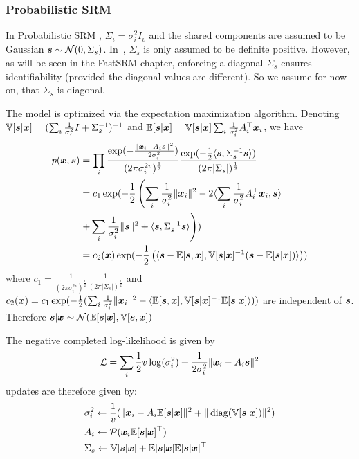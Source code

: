 \subsubsection{Probabilistic SRM}
\label{sec:probabilisticsrm}
In Probabilistic SRM , $\Sigma_i=\sigma_i^2 I_v$ and the shared
components are assumed to be Gaussian $\boldsymbol{s} \sim \mathcal{N}(0, \Sigma_s)$.
In~\cite{chen2015reduced}, $\Sigma_s$ is only assumed to be definite positive. However,
as will be seen in the FastSRM chapter, enforcing a diagonal $\Sigma_s$ ensures
identifiability (provided the diagonal values are different). So we assume for
now on, that $\Sigma_s$ is diagonal.

The model is optimized via the expectation maximization algorithm.
Denoting $\mathbb{V}[\boldsymbol{s} | \boldsymbol{x}] = (\sum_i \frac1{\sigma_i^2} I +
\Sigma_s^{-1})^{-1}$ and $\mathbb{E}[\boldsymbol{s} | \boldsymbol{x}] = \mathbb{V}[\boldsymbol{s} | \boldsymbol{x}] \sum_i \frac1{\sigma_i^2}
A_i^{\top}\boldsymbol{x}_i$, we have
\begin{align}
  p(\boldsymbol{x}, \boldsymbol{s}) &= \prod_i \frac{\exp(-\frac{\|\boldsymbol{x}_i - A_i \boldsymbol{s} \|^2}{2 \sigma_i^2})}{(2 \pi \sigma_i^{2v})^{\frac12}} \frac{\exp(-\frac12 \langle{ \boldsymbol{s}},{ \Sigma_s^{-1} \boldsymbol{s} }\rangle )}{(2 \pi | \Sigma_s|)^{\frac12}} \\
               &= c_1 \exp(-\frac12 \left( \sum_i \frac1{\sigma_i^2}\|\boldsymbol{x}_i\|^2 - 2  \langle{ \sum_i \frac1{\sigma_i^2} A_i^{\top}\boldsymbol{x}_i},{ \boldsymbol{s} }\rangle \right. \\& \left.+ \sum_i \frac1{\sigma_i^2} \| \boldsymbol{s} \|^2 + \langle{ \boldsymbol{s}},{ \Sigma_s^{-1} \boldsymbol{s} }\rangle  \right)) \\
               &= c_2(\boldsymbol{x}) \exp(-\frac12 \left( \langle{  \boldsymbol{s}- \mathbb{E}[\boldsymbol{s}},{ \boldsymbol{x}], \mathbb{V}[\boldsymbol{s} | \boldsymbol{x}]^{-1} ( \boldsymbol{s} - \mathbb{E}[\boldsymbol{s} | \boldsymbol{x}])  }\rangle \right)) \label{probsrmcompleted}
\end{align}
where $c_1 = \frac1{(2 \pi \sigma_i^{2v})^{\frac12}}\frac1{(2 \pi |
  \Sigma_s|)^{\frac12}}$ and $c_2(\boldsymbol{x}) = c_1 \exp(-\frac12( \sum_i
\frac1{\sigma_i^2}\|\boldsymbol{x}_i\|^2 - \langle{  \mathbb{E}[\boldsymbol{s}},{ \boldsymbol{x}], \mathbb{V}[\boldsymbol{s} | \boldsymbol{x}]^{-1} \mathbb{E}[\boldsymbol{s} | \boldsymbol{x}] }\rangle))$ are independent of $\boldsymbol{s}$.
Therefore $\boldsymbol{s}| \boldsymbol{x} \sim \mathcal{N}(\mathbb{E}[\boldsymbol{s} | \boldsymbol{x}], \mathbb{V}[\boldsymbol{s}, \boldsymbol{x}])$

The negative completed log-likelihood is given by
\begin{align}
	\mathcal{L} = \sum_i \frac12 v \log(\sigma_i^2) + \frac1{2 \sigma_i^2} \| \boldsymbol{x}_i - A_i \boldsymbol{s} \|^2
\end{align}
updates are therefore given by:
\begin{align}
&\sigma_i^2 \leftarrow \frac1{v} (\| \boldsymbol{x}_i - A_i \mathbb{E}[\boldsymbol{s}|\boldsymbol{x}]\|^2 + \| \operatorname*{diag}(\mathbb{V}[\boldsymbol{s} | \boldsymbol{x}]) \|^2) \\
  &A_i \leftarrow \mathcal{P}(\boldsymbol{x}_i \mathbb{E}[\boldsymbol{s}|\boldsymbol{x}]^{\top}) \label{eq:psrm:Aiupdate} \\
  & \Sigma_s \leftarrow \mathbb{V}[\boldsymbol{s} | \boldsymbol{x}] + \mathbb{E}[\boldsymbol{s} | \boldsymbol{x}] \mathbb{E}[\boldsymbol{s} | \boldsymbol{x}]^{\top}
\end{align}

